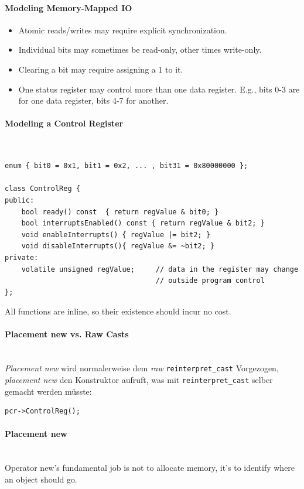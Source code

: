 \paragraph{Modeling Memory-Mapped IO}
\begin{itemize}
	\item Atomic reads/writes may require explicit synchronization.
	\item Individual bits may sometimes be read-only, other times write-only.
	\item Clearing a bit may require assigning a 1 to it.
	\item One status register may control more than one data register.
		E.g., bits 0-3 are for one data register, bits 4-7 for another.
\end{itemize}

\paragraph{Modeling a Control Register}~
\begin{lstlisting}
enum { bit0 = 0x1, bit1 = 0x2, ... , bit31 = 0x80000000 };

class ControlReg {
public:
	bool ready() const 	{ return regValue & bit0; }
	bool interruptsEnabled() const { return regValue & bit2; }
	void enableInterrupts() { regValue |= bit2; }
	void disableInterrupts(){ regValue &= ~bit2; }
private:
	volatile unsigned regValue;		// data in the register may change
									// outside program control
};
\end{lstlisting}

All functions are inline, so their existence should incur no cost.

\paragraph{Placement new vs. Raw Casts}~\\
\emph{Placement new} wird normalerweise dem \emph{raw} \texttt{reinterpret\_cast} Vorgezogen, \emph{placement new} den Konstruktor aufruft, was mit \texttt{reinterpret\_cast} selber gemacht werden müsste:
\begin{lstlisting}
pcr->ControlReg();
\end{lstlisting}

\paragraph{Placement new}~\\
Operator new’s fundamental job is not to allocate memory, it’s to identify where an object should go.

